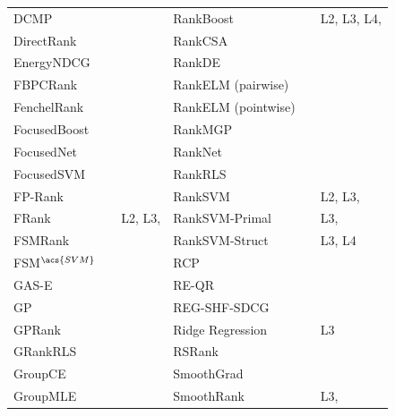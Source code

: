 \begin{table}[!h!p]
{\begin{tabular}{|l|l|l||l|l|l|}
DCMP & \cite{Renjifo2012}  & \cite{Renjifo2012}  & RankBoost & \cite{Freund2003} & L2, L3, L4, \cite{Busa-Fekete2013, Alcantara2010} \\ 
DirectRank & \cite{Tan2013} & \cite{Tan2013} & RankCSA & \cite{He2010} & \cite{He2010} \\ 
Energy\acs{NDCG} & \cite{Freno2011} & \cite{Freno2011} & RankDE & \cite{Bollegala2011} & \cite{Sato2013} \\ 
FBPCRank & \cite{Lai2011} & \cite{Lai2011} & RankELM (pairwise) & \cite{Zong2013} & \cite{Zong2013} \\ 
FenchelRank & \cite{Lai2013} & \cite{Lai2013, Lai2013b, Laporte2013} & RankELM (pointwise) & \cite{Zong2013} & \cite{Zong2013} \\ 
FocusedBoost & \cite{Niu2012} & \cite{Niu2012} & RankMGP & \cite{Lin2012} & \cite{Lin2012} \\ 
FocusedNet & \cite{Niu2012} & \cite{Niu2012} & RankNet & \cite{Burges2005} & \cite{Busa-Fekete2013, Papini2012, Niu2012} \\ 
Focused\acs{SVM} & \cite{Niu2012} & \cite{Niu2012} & Rank\acs{RLS} & \cite{Pahikkala2009} & \cite{Pahikkala2010} \\ 
FP-Rank & \cite{Song2013} & \cite{Song2013} & Rank\acs{SVM} & \cite{Herbrich1999, Joachims2002} & L2, L3, \cite{Busa-Fekete2013, Freno2011, He2010, Alcantara2010} \\ 
FRank & \cite{Tsai2007} & L2, L3, \cite{Wang2012} & Rank\acs{SVM}-Primal &  & L3, \cite{Lai2011} \\ 
FSMRank & \cite{Lai2013c} & \cite{Lai2013c,Laporte2013} & Rank\acs{SVM}-Struct &  & L3, L4 \\
FSM$^{\acs{SVM}}$ & \cite{Lai2013c} & \cite{Lai2013c} & RCP & \cite{Elsas2008} & \cite{Elsas2008} \\ 
GAS-E & \cite{Geng2007} & \cite{Lai2013c} & RE-QR & \cite{Veloso2010} & \cite{Veloso2010} \\
\acs{GP} & \cite{DeAlmeida2007} & \cite{Alcantara2010} & REG-SHF-SDCG & \cite{Wu2009} & \cite{Wu2009} \\  
\acs{GP}Rank & \cite{Silva2009} & \cite{Torkestani2012} & Ridge Regression & \cite{Cossock2006} & L3 \\
GRank\acs{RLS} & \cite{Pahikkala2010} & \cite{Pahikkala2010} & RSRank & \cite{Sun2009} & \cite{Lai2013} \\ 
Group\acs{CE} & \cite{Lin2011} & \cite{Lin2011} & SmoothGrad & \cite{Le2007} & \cite{Tan2013} \\ 
Group\acs{MLE} & \cite{Lin2010} & \cite{Lin2011} & SmoothRank & \cite{Chapelle2010} & L3, \cite{Chapelle2010} \\

\end{tabular}}
\end{table}
